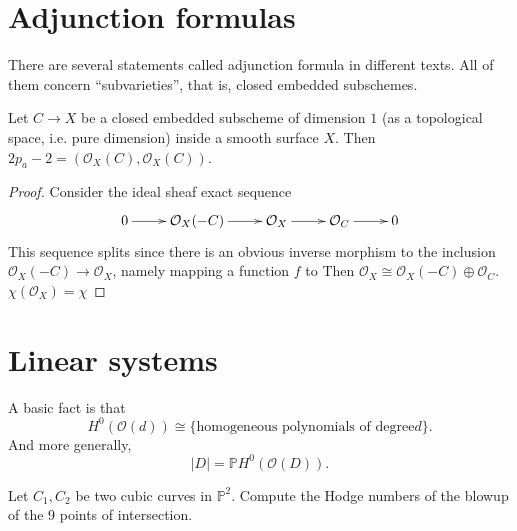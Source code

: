 \section{Adjunction formulas}
\label{section-adjunction formulas}

There are several statements called
adjunction formula
in different texts. All of them concern
``subvarieties'',
that is, closed embedded subschemes.

\begin{exercise}
\label{exercise-genus-formu-curve-surfa}
Let $C \to X$ be a closed embedded subscheme
of dimension $1$ (as a topological space,
i.e. pure dimension)
inside a smooth surface $X$.
Then
$2p_a-2=(\mathcal{O}_X(C),\mathcal{O}_X(C))$.
\end{exercise}

\begin{proof}
Consider the ideal sheaf exact sequence
$$
\xymatrix{
0\ar[r]&\mathcal{O}_X(-C)\ar[r]&\mathcal{O}
_X\ar[r]&\mathcal{O}_C\ar[r]&0
}
$$
This sequence splits since there is an
obvious inverse morphism
to the inclusion $\mathcal{O}_X(-C)\to
\mathcal{O}_X$, namely
mapping a function $f$ to
Then $\mathcal{O}_X\cong \mathcal{O}_X(-C)
\oplus \mathcal{O}_C$.
 $\chi(\mathcal{O}_X)=\chi$
\end{proof}


\section{Linear systems}
\label{section-linear-systems}

\noindent
A basic fact is that
$$
H^0(\mathcal{O}(d)) \cong
\{\text{homogeneous polynomials of degree
$d$}\}.
$$
And more generally,
$$
|D|=\mathbb{P}H^0(\mathcal{O}(D)).
$$

\begin{exercise}
\label{exercise-hodge-numbers-blow-up-9pts}
Let $C_1,C_2$ be two cubic curves in
$\mathbb{P}^2$.
Compute the Hodge numbers of the blowup of
the 9 points
of intersection.
\end{exercise}

